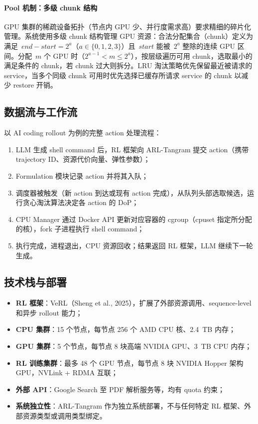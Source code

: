 \documentclass[11pt, a4paper]{article}
\begin{document}
\paragraph{Pool 机制：多级 chunk 结构}
GPU 集群的稀疏设备拓扑（节点内 GPU 少、并行度需求高）要求精细的碎片化管理。系统使用多级 chunk 结构管理 GPU 资源：合法分配集合（chunk）定义为满足~$\mathit{end} - \mathit{start} = 2^a$（$a \in \{0,1,2,3\}$）且~$\mathit{start}$ 能被~$2^a$ 整除的连续 GPU 区间。分配~$m$ 个 GPU 时（$2^{a-1} < m \leq 2^a$），按层级遍历可用 chunk，选取最小的满足条件的 chunk，若 chunk 过大则拆分。LRU 淘汰策略优先保留最近被请求的 service，当多个同级 chunk 可用时优先选择已缓存所请求 service 的 chunk 以减少 restore 开销。

\subsection{数据流与工作流}

以 AI coding rollout 为例的完整 action 处理流程：

\begin{enumerate}
  \item LLM 生成 shell command 后，RL 框架向 ARL-Tangram 提交 action（携带 trajectory ID、资源代价向量、弹性参数）；
  \item Formulation 模块记录 action 并将其入队；
  \item 调度器被触发（新 action 到达或现有 action 完成），从队列头部选取候选，运行贪心淘汰算法决定各 action 的 DoP；
  \item CPU Manager 通过 Docker API 更新对应容器的 cgroup（cpuset 指定所分配的核），fork 子进程执行 shell command；
  \item 执行完成，进程退出，CPU 资源回收；结果返回 RL 框架，LLM 继续下一轮生成。
\end{enumerate}

\subsection{技术栈与部署}

\begin{itemize}
  \item \textbf{RL 框架}：VeRL（Sheng et al., 2025），扩展了外部资源调用、sequence-level 和异步 rollout 能力；
  \item \textbf{CPU 集群}：15 个节点，每节点 256 个 AMD CPU 核、2.4~TB 内存；
  \item \textbf{GPU 集群}：5 个节点，每节点 8 块高端 NVIDIA GPU、3~TB CPU 内存；
  \item \textbf{RL 训练集群}：最多 48 个 GPU 节点，每节点 8 块 NVIDIA Hopper 架构 GPU，NVLink + RDMA 互联；
  \item \textbf{外部 API}：Google Search 至 PDF 解析服务等，均有 quota 约束；
  \item \textbf{系统独立性}：ARL-Tangram 作为独立系统部署，不与任何特定 RL 框架、外部资源类型或调用类型绑定。
\end{itemize}
\end{document}
